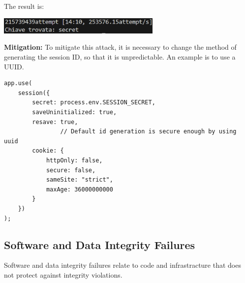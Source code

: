 \documentclass[]{article}
\begin{document}
The result is: 
\begin{center}
\includegraphics[width=8cm]{images/brute_force.eps}
\end{center}
 \textbf{Mitigation:} To mitigate this attack, it is necessary to change the method of generating the session ID, so that it is unpredictable. An example is to use a UUID.
\begin{lstlisting}
app.use(
    session({
        secret: process.env.SESSION_SECRET,
        saveUninitialized: true,
        resave: true,
				// Default id generation is secure enough by using uuid
        cookie: {
            httpOnly: false,
            secure: false,
            sameSite: "strict",
            maxAge: 36000000000
        }
    })
);
\end{lstlisting}

\subsection{Software and Data Integrity Failures}
Software and data integrity failures relate to code and infrastracture that does not protect against integrity violations. 
\end{document}
